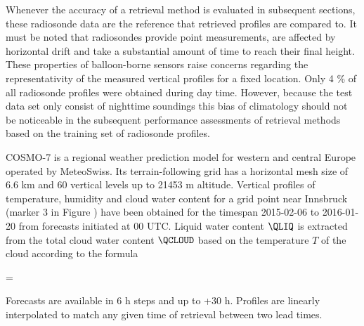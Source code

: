     Whenever the accuracy of a retrieval method is evaluated in subsequent
    sections, these radiosonde data are the reference that retrieved profiles
    are compared to. It must be noted that radiosondes provide point
    measurements, are affected by horizontal drift and take a substantial amount
    of time to reach their final height. These properties of balloon-borne
    sensors raise concerns regarding the representativity of the measured
    vertical profiles for a fixed location. Only 4 \% of all radiosonde
    profiles were obtained during day time. However, because the test data set
    only consist of nighttime soundings this bias of climatology should not be
    noticeable in the subsequent performance assessments of retrieval methods
    based on the training set of radiosonde profiles.


\stopsection

    {\externalfigure[map][width=\textwidth]}


\startsection[title=COSMO-7 Simulated Soundings]

    COSMO-7 is a regional weather prediction model for western and central
    Europe operated by MeteoSwiss. Its terrain-following grid has a
    horizontal mesh size of 6.6 km and 60 vertical levels up to 21453
    m altitude. Vertical profiles of temperature, humidity and cloud water
    content for a grid point near Innsbruck (marker 3 in Figure
    ) have been obtained for the timespan 2015-02-06 to
    2016-01-20 from forecasts initiated at 00 UTC. Liquid water content
    $\QLIQ$ is extracted from the total cloud water content $\QCLOUD$ based on
    the temperature $T$ of the cloud according to the formula

    \startformula
        \QLIQ = \QCLOUD \startcases
              \, \KELVIN \le \TEMP \NR
            \NC {}
                 \, \KELVIN \lt \TEMP {} \, \KELVIN \EQSTOP \NR
              \, \KELVIN \le \TEMP \NR
        \stopcases
    \stopformula

    Forecasts are available in 6 h steps and up to +30 h. Profiles are linearly
    interpolated to match any given time of retrieval between two lead times.

